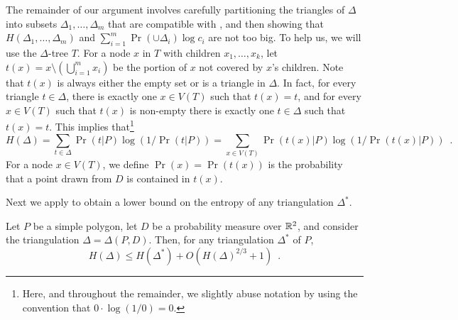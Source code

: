 \documentclass[lotsofwhite]{patmorin}
\begin{document}
The remainder of our argument involves carefully partitioning the
triangles of $\Delta$ into subsets $\Delta_1,\ldots,\Delta_m$ that are
compatible with , and then showing that
$H(\Delta_1,\ldots,\Delta_m)$ and $\sum_{i=1}^m \Pr(\cup\Delta_i)\log
c_i$ are not too big.  To help us, we will use
the $\Delta$-tree $T$.  For a node $x$ in $T$ with children
$x_1,\ldots,x_k$, let $t(x) = x \setminus (\bigcup_{i=1}^m x_i)$ be
the portion of $x$ not covered by $x$'s children.  Note that $t(x)$ is
always either the empty set or is a triangle in $\Delta$.  In fact,
for every triangle $t\in\Delta$, there is exactly one $x\in V(T)$ such
that $t(x)=t$, and for every $x\in V(T)$ such that $t(x)$ is non-empty
there is exactly one $t\in\Delta$ such that $t(x)=t$.  This implies
that\footnote{Here, and throughout the remainder, we slightly abuse notation by
using the convention that $0\cdot\log(1/0)=0$.}
\[
    H(\Delta) = \sum_{t\in\Delta}\Pr(t|P)\log(1/\Pr(t|P)) =
       \sum_{x\in V(T)}\Pr(t(x)|P)\log(1/\Pr(t(x)|P)) \enspace .
\]
For a node $x\in V(T)$, we define $\Pr(x)=\Pr(t(x))$ is the
probability that a point drawn from $D$ is contained in $t(x)$.

Next we apply  to obtain a lower bound on the
entropy of any triangulation $\Delta^*$. 

\begin{lem}
Let $P$ be a simple polygon, let $D$ be a probability measure over
$\mathbb{R}^2$, and consider the triangulation $\Delta=\Delta(P,D)$.
Then, for any triangulation $\Delta^*$ of $P$,
\[
    H(\Delta) \le H(\Delta^*) + O(H(\Delta)^{2/3}+1) \enspace .
\]
\end{lem}
\end{document}
